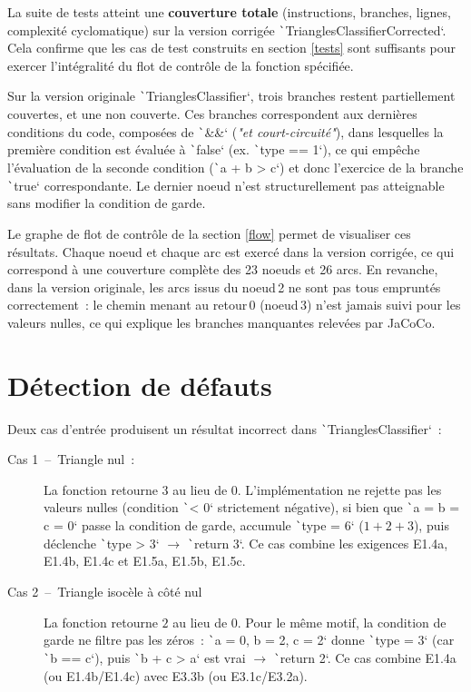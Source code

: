 \documentclass[a4paper,11pt]{article}
\begin{document}
La suite de tests atteint une \textbf{couverture totale} (instructions, branches, lignes, complexité cyclo\-matique) sur la version corrigée \texttt`TrianglesClassifierCorrected`. Cela confirme que les cas de test construits en section \ref{tests} sont suffisants pour exercer l'intégralité du flot de contrôle de la fonction spécifiée.

Sur la version originale \texttt`TrianglesClassifier`, trois branches restent partiellement couvertes, et une non couverte. Ces branches correspondent aux dernières conditions du code, composées de \texttt`&&` (\textit{"et court-circuité"}), dans lesquelles la première condition est évaluée à \texttt`false` (ex. \texttt`type == 1`), ce qui empêche l'évaluation de la seconde condition (\texttt`a + b > c`) et donc l'exercice de la branche \texttt`true` correspondante. Le dernier noeud n'est structurellement pas atteignable sans modifier la condition de garde.

Le graphe de flot de contrôle de la section \ref{flow} permet de visualiser ces résultats. Chaque noeud et chaque arc est exercé dans la version corrigée, ce qui correspond à une couverture complète des 23 noeuds et 26 arcs. En revanche, dans la version originale, les arcs issus du noeud 2 ne sont pas tous empruntés correctement~: le chemin menant au retour 0 (noeud 3) n’est jamais suivi pour les valeurs nulles, ce qui explique les branches manquantes relevées par JaCoCo.

\section{Détection de défauts}

Deux cas d'entrée produisent un résultat incorrect dans \texttt`TrianglesClassifier`~:

\begin{description}
    \item[Cas 1~--~Triangle nul~:] La fonction retourne $3$ au lieu de $0$. L'implé\-mentation ne rejette pas les valeurs nulles (condition \texttt`< 0` strictement négative), si bien que \texttt`a = b = c = 0` passe la condition de garde, accumule \texttt`type = 6` ($1 + 2 + 3$), puis déclenche \texttt`type > 3` $\to$ \texttt`return 3`. Ce cas combine les exigences E1.4a, E1.4b, E1.4c et E1.5a, E1.5b, E1.5c.
    \item[Cas 2~--~Triangle isocèle à côté nul~] La fonction retourne $2$ au lieu de $0$. Pour le même motif, la condition de garde ne filtre pas les zéros~: \texttt`a = 0, b = 2, c = 2` donne \texttt`type = 3` (car \texttt`b == c`), puis \texttt`b + c > a` est vrai $\to$ \texttt`return 2`. Ce cas combine E1.4a (ou E1.4b/E1.4c) avec E3.3b (ou E3.1c/E3.2a).
\end{description}
\end{document}
